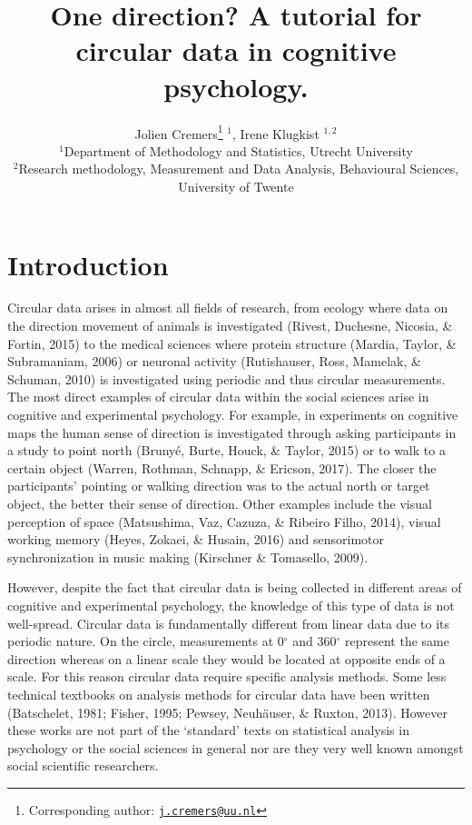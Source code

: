 \documentclass[11pt,]{article}
\title{One direction? A tutorial for circular data in cognitive psychology.}
\author{Jolien Cremers\footnote{Corresponding author:
  \href{mailto:j.cremers@uu.nl}{\nolinkurl{j.cremers@uu.nl}}} \(^1\),
Irene Klugkist \(^{1,2}\)\\
\(^1\)Department of Methodology and Statistics, Utrecht University\\
\(^2\)Research methodology, Measurement and Data Analysis, Behavioural
Sciences, University of Twente}
\date{}
\begin{document}
\maketitle

\section{Introduction}\label{Introduction}

Circular data arises in almost all fields of research, from ecology
where data on the direction movement of animals is investigated (Rivest,
Duchesne, Nicosia, \& Fortin, 2015) to the medical sciences where
protein structure (Mardia, Taylor, \& Subramaniam, 2006) or neuronal
activity (Rutishauser, Ross, Mamelak, \& Schuman, 2010) is investigated
using periodic and thus circular measurements. The most direct examples
of circular data within the social sciences arise in cognitive and
experimental psychology. For example, in experiments on cognitive maps
the human sense of direction is investigated through asking participants
in a study to point north (Brunyé, Burte, Houck, \& Taylor, 2015) or to
walk to a certain object (Warren, Rothman, Schnapp, \& Ericson, 2017).
The closer the participants' pointing or walking direction was to the
actual north or target object, the better their sense of direction.
Other examples include the visual perception of space (Matsushima, Vaz,
Cazuza, \& Ribeiro Filho, 2014), visual working memory (Heyes, Zokaei,
\& Husain, 2016) and sensorimotor synchronization in music making
(Kirschner \& Tomasello, 2009).

However, despite the fact that circular data is being collected in
different areas of cognitive and experimental psychology, the knowledge
of this type of data is not well-spread. Circular data is fundamentally
different from linear data due to its periodic nature. On the circle,
measurements at 0\(^\circ\) and 360\(^\circ\) represent the same
direction whereas on a linear scale they would be located at opposite
ends of a scale. For this reason circular data require specific analysis
methods. Some less technical textbooks on analysis methods for circular
data have been written (Batschelet, 1981; Fisher, 1995; Pewsey,
Neuhäuser, \& Ruxton, 2013). However these works are not part of the
`standard' texts on statistical analysis in psychology or the social
sciences in general nor are they very well known amongst social
scientific researchers.
\end{document}
